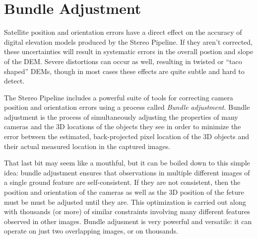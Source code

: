 \chapter{Bundle Adjustment}
\label{ch:bundle_adjustment}

Satellite position and orientation errors have a direct effect on the
accuracy of digital elevation models produced by the Stereo Pipeline.
If they aren't corrected, these uncertainties will result in
systematic errors in the overall postion and slope of the DEM.  Severe
distortions can occur as well, resulting in twisted or ``taco shaped''
DEMs, though in most cases these effects are quite subtle and hard to
detect.

The Stereo Pipeline includes a powerful suite of tools for correcting
camera position and orientation errors using a process called {\em
  Bundle adjustment}.  Bundle adjustment is the process of
simultaneously adjusting the properties of many cameras and the 3D
locations of the objects they see in order to minimize the error
between the estimated, back-projected pixel location of the 3D objects
and their actual measured location in the captured images.

That last bit may seem like a mouthful, but it can be boiled down to
this simple idea: bundle adjustment ensures that observations in
multiple different images of a single ground feature are
self-consistent.  If they are not consistent, then the position and
orientation of the cameras as well as the 3D position of the feture
must be must be adjusted until they are.  This optimization is carried
out along with thousands (or more) of similar constraints involving
many different features observed in other images.  Bundle adjusment is
very powerful and versatile: it can operate on just two overlapping
images, or on thousands.


